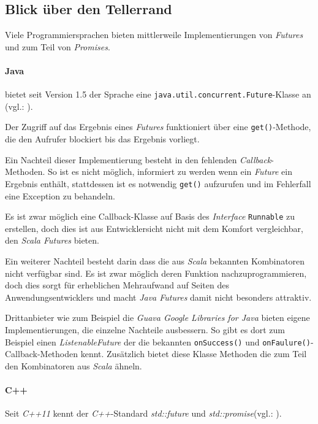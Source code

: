 \subsection{Blick über den Tellerrand}


Viele Programmiersprachen bieten mittlerweile Implementierungen von
\emph{Futures} und zum Teil von \emph{Promises}.

\paragraph{Java} bietet seit Version 1.5 der Sprache eine 
\texttt{java.util.concurrent.Future}-Klasse an (vgl.: \cite{javadocfuture}).

Der Zugriff auf das Ergebnis eines \emph{Futures} funktioniert über
eine \texttt{get()}-Methode, die den Aufrufer blockiert bis das
Ergebnis vorliegt.

Ein Nachteil dieser Implementierung besteht in den fehlenden
\emph{Callback}-Methoden. So ist es nicht möglich, informiert
zu werden wenn ein \emph{Future} ein Ergebnis enthält, stattdessen
ist es notwendig \texttt{get()} aufzurufen und im Fehlerfall
eine Exception zu behandeln.

Es ist zwar möglich eine Callback-Klasse auf Basis des \emph{Interface}
\texttt{Runnable} zu erstellen, doch dies ist aus Entwicklersicht
nicht mit dem Komfort vergleichbar, den \emph{Scala Futures} bieten.

Ein weiterer Nachteil besteht darin dass die aus \emph{Scala} bekannten
Kombinatoren nicht verfügbar sind. Es ist zwar möglich deren Funktion
nachzuprogrammieren, doch dies sorgt für erheblichen Mehraufwand
auf Seiten des Anwendungsentwicklers und macht \emph{Java Futures}
damit nicht besonders attraktiv.

Drittanbieter wie zum Beispiel die \emph{Guava Google Libraries for Java}
bieten eigene Implementierungen, die einzelne Nachteile ausbessern.
So gibt es dort zum Beispiel einen \emph{ListenableFuture} der die
bekannten \texttt{onSuccess()} und \texttt{onFaulure()}-Callback-Methoden
kennt. Zusätzlich bietet diese Klasse Methoden die zum Teil den
Kombinatoren aus \emph{Scala} ähneln.

\paragraph{C++} Seit \emph{C++11} kennt der \emph{C++}-Standard
\emph{std::future} und \emph{std::promise}(vgl.: \cite{cpp11FAQ}).

